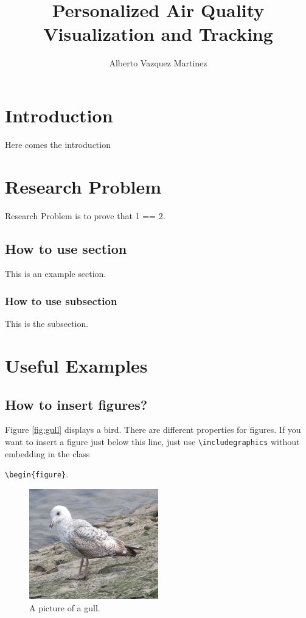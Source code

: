 \documentclass[bsc,logo]{infthesis}
\title{Personalized Air Quality Visualization and Tracking}
\author{Alberto Vazquez Martinez}
\begin{document}
\begin{preliminary}

\maketitle

\tableofcontents
\listoffigures
\listoftables

\end{preliminary}

\chapter{Introduction}
Here comes the introduction

\chapter{Research Problem}
\label{sec:problem}
Research Problem is to prove that 1 == 2.

\section{How to use section}
\label{sec:probSubSec}
This is an example section.

\subsection{How to use subsection}
This is the subsection.

\chapter{Useful Examples}
\section{How to insert figures?}
Figure \ref{fig:gull} displays a bird. There are different properties for figures. If you want to insert a figure just below this line, just use \texttt{\textbackslash includegraphics} without embedding in the class

\texttt{\textbackslash begin\{figure\}}.

\begin{figure}[h!]
  \centering
    \includegraphics[width=0.5\textwidth]{gull}
    \caption{A picture of a gull.}
    \label{fig:gull3} 
\end{figure} 
\end{document}
